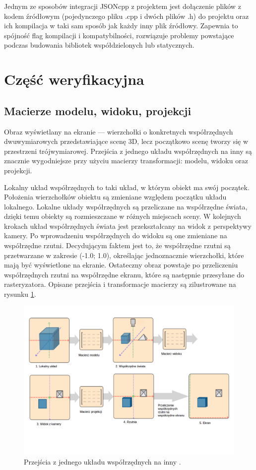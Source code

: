 Jednym ze sposobów integracji JSONcpp z projektem jest dołączenie plików z kodem źródłowym (pojedynczego pliku .cpp i dwóch plików .h) do projektu oraz ich kompilacja w taki sam sposób jak każdy inny plik źródłowy. Zapewnia to spójność flag kompilacji i kompatybilności, rozwiązuje problemy powstające podczas budowania bibliotek współdzielonych lub statycznych.

\newpage
\section{Część weryfikacyjna}
\subsection{Macierze modelu, widoku, projekcji}
Obraz wyświetlany na ekranie --- wierzchołki o konkretnych współrzędnych dwuwymiarowych przedstawiające scenę 3D, lecz początkowo scenę tworzy się w przestrzeni trójwymiarowej. Przejścia z jednego układu współrzędnych na inny są znacznie wygodniejsze przy użyciu macierzy transformacji: modelu, widoku oraz projekcji.

Lokalny układ współrzędnych to taki układ, w którym obiekt ma swój początek. Położenia wierzchołków obiektu są zmieniane względem początku układu lokalnego. Lokalne układy współrzędnych są przeliczane na współrzędne świata, dzięki temu obiekty są rozmieszczane w różnych miejscach sceny. W kolejnych krokach układ współrzędnych świata jest przekształcany na widok z perspektywy kamery. Po wprowadzeniu współrzędnych do widoku są one zmieniane na współrzędne rzutni. Decydującym faktem jest to, że współrzędne rzutni są przetwarzane w zakresie (-1.0; 1.0), określając jednoznacznie wierzchołki, które mają być wyświetlone na ekranie. Ostateczny obraz powstaje po przeliczeniu współrzędnych rzutni na współrzędne ekranu, które są następnie przesyłane do rasteryzatora. Opisane przejścia i transformacje macierzy są zilustrowane na rysunku \ref{rys11}.

\begin{figure}[H]
		\centering
 		\includegraphics[width=12.0cm]{coordinate_systems.png}
    	\caption{Przejścia z jednego układu współrzędnych na inny \cite{opengltutorial}.}
 		\label{rys11}
\end{figure}


